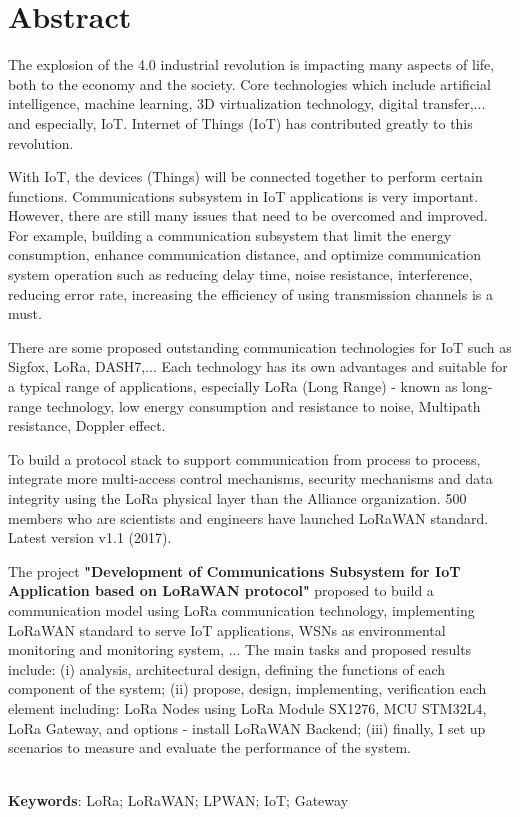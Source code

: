 \thispagestyle{plain}
\chapter*{Abstract}
The explosion of the 4.0 industrial revolution is impacting many aspects of life, both to the economy and the society. Core technologies which include artificial intelligence, machine learning, 3D virtualization technology, digital transfer,... and especially, IoT. Internet of Things (IoT) has contributed greatly to this revolution. \par
With IoT, the devices (Things) will be connected together to perform certain functions. Communications subsystem in IoT applications is very important. However, there are still many issues that need to be overcomed and improved. For example, building a communication subsystem that limit the energy consumption, enhance communication distance, and optimize communication system operation such as reducing delay time, noise resistance, interference, reducing error rate, increasing the efficiency of using transmission channels is a must. \par 
There are some proposed outstanding communication technologies for IoT such as Sigfox, LoRa, DASH7,... Each technology has its own advantages and suitable for a typical range of applications, especially LoRa (Long Range) - known as long-range technology, low energy consumption and resistance to noise, Multipath resistance, Doppler effect. \par
To build a protocol stack to support communication from process to process, integrate more multi-access control mechanisms, security mechanisms and data integrity using the LoRa physical layer than the Alliance organization. 500 members who are scientists and engineers have launched LoRaWAN standard. Latest version v1.1 (2017). \par 
The project \textbf{"Development of Communications Subsystem for IoT Application based on LoRaWAN protocol"} proposed to build a communication model using LoRa communication technology, implementing LoRaWAN standard to serve IoT applications, WSNs as environmental monitoring and monitoring system, ... The main tasks and proposed results include: (i) analysis, architectural design, defining the functions of each component of the system; (ii) propose, design, implementing, verification each element including: LoRa Nodes using LoRa Module SX1276, MCU STM32L4, LoRa Gateway, and options - install LoRaWAN Backend; (iii) finally, I set up scenarios to measure and evaluate the performance of the system. \par 
\\
\textbf{Keywords}: LoRa; LoRaWAN; LPWAN; IoT; Gateway 


